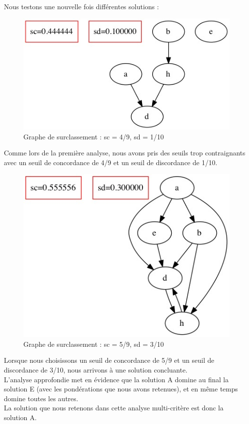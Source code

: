 Nous testons une nouvelle fois différentes solutions : \\
\begin{figure}
    \begin{center}
        \includegraphics[scale=0.7]{partie3/graph_4_9_1_10.jpeg}
        \caption{Graphe de surclassement : sc = 4/9, sd = 1/10}
    \end{center}
\end{figure}

Comme lors de la première analyse, nous avons pris des seuils trop
contraignants avec un seuil de concordance de 4/9 et un seuil de discordance de
1/10. \\

\begin{figure}
    \begin{center}
        \includegraphics[scale=0.7]{partie3/graph_5_9_3_10.jpeg}
        \caption{Graphe de surclassement : sc = 5/9, sd = 3/10}
    \end{center}
\end{figure}

Lorsque nous choisissons un seuil de concordance de 5/9 et un seuil de
discordance de 3/10, nous arrivons à une solution concluante. \\

L’analyse approfondie met en évidence que la solution A domine au final la
solution E (avec les pondérations que nous avons retenues), et en même temps
domine toutes les autres. \\
La solution que nous retenons dans cette analyse multi-critère est donc la solution A. \\
